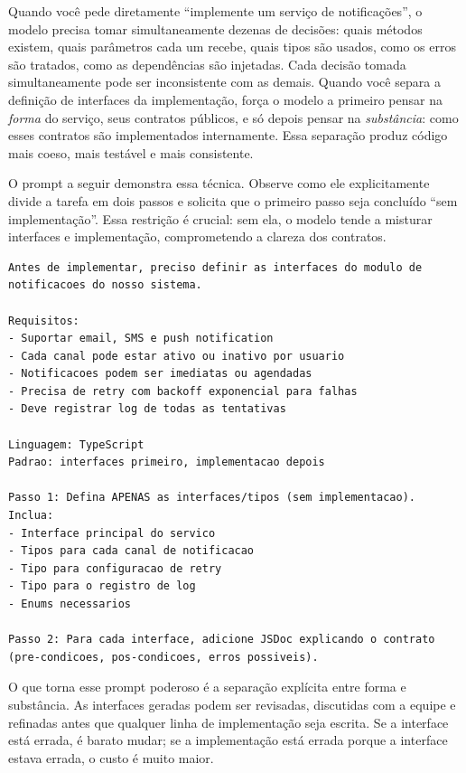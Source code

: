 Quando você pede diretamente ``implemente um serviço de notificações'', o modelo
precisa tomar simultaneamente dezenas de decisões: quais métodos existem, quais
parâmetros cada um recebe, quais tipos são usados, como os erros são tratados,
como as dependências são injetadas. Cada decisão tomada simultaneamente pode ser
inconsistente com as demais. Quando você separa a definição de interfaces da
implementação, força o modelo a primeiro pensar na \textit{forma} do serviço,
seus contratos públicos, e só depois pensar na \textit{substância}: como
esses contratos são implementados internamente. Essa separação produz código mais
coeso, mais testável e mais consistente.

O prompt a seguir demonstra essa técnica. Observe como ele explicitamente divide
a tarefa em dois passos e solicita que o primeiro passo seja concluído ``sem
implementação''. Essa restrição é crucial: sem ela, o modelo tende a misturar
interfaces e implementação, comprometendo a clareza dos contratos.

\begin{lstlisting}[language={}, caption={Prompt para definição de interfaces antes da implementação}]
Antes de implementar, preciso definir as interfaces do modulo de
notificacoes do nosso sistema.

Requisitos:
- Suportar email, SMS e push notification
- Cada canal pode estar ativo ou inativo por usuario
- Notificacoes podem ser imediatas ou agendadas
- Precisa de retry com backoff exponencial para falhas
- Deve registrar log de todas as tentativas

Linguagem: TypeScript
Padrao: interfaces primeiro, implementacao depois

Passo 1: Defina APENAS as interfaces/tipos (sem implementacao).
Inclua:
- Interface principal do servico
- Tipos para cada canal de notificacao
- Tipo para configuracao de retry
- Tipo para o registro de log
- Enums necessarios

Passo 2: Para cada interface, adicione JSDoc explicando o contrato
(pre-condicoes, pos-condicoes, erros possiveis).
\end{lstlisting}

O que torna esse prompt poderoso é a separação explícita entre forma e substância.
As interfaces geradas podem ser revisadas, discutidas com a equipe e refinadas
antes que qualquer linha de implementação seja escrita. Se a interface está errada,
é barato mudar; se a implementação está errada porque a interface estava errada,
o custo é muito maior.

